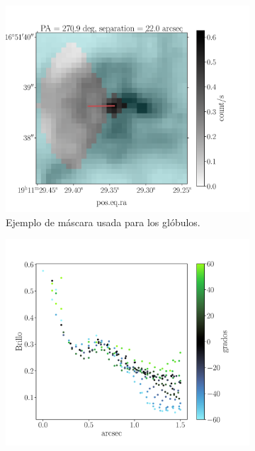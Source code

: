 \documentclass{book}
\begin{document}
\begin{figure}[htb]
  \begin{subfigure}[b]{0.5\textwidth}
    \includegraphics[width=\textwidth, height=0.9\textwidth]{Nuevas imagenes finales/F_4_1_A.pdf}
    \caption{Ejemplo de máscara usada para los glóbulos.}
    \label{fig:f1}
  \end{subfigure}
  \hfill
  \begin{subfigure}[b]{0.5\textwidth}
    \includegraphics[width=\textwidth, height=0.9\textwidth]{Nuevas imagenes finales/F_4_1_B.pdf}

\end{subfigure}
\end{figure}
\end{document}
